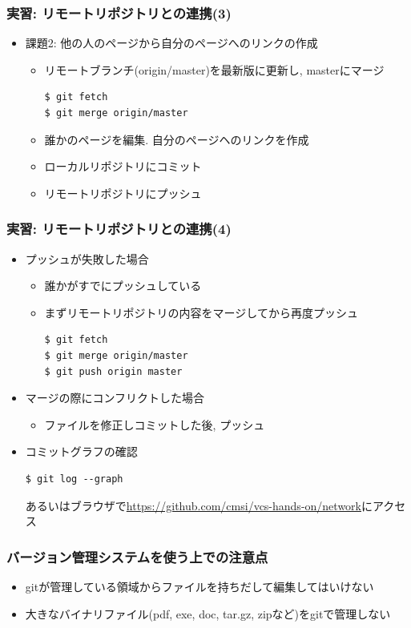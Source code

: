 \begin{frame}[t,fragile]
  \frametitle{実習: リモートリポジトリとの連携(3)}
  \begin{itemize}
  \item 課題2: 他の人のページから自分のページへのリンクの作成
    \begin{itemize}
      \item リモートブランチ(origin/master)を最新版に更新し, masterにマージ
\begin{lstlisting}
$ git fetch
$ git merge origin/master
\end{lstlisting}
      \item 誰かのページを編集. 自分のページヘのリンクを作成
      \item ローカルリポジトリにコミット
      \item リモートリポジトリにプッシュ
    \end{itemize}
  \end{itemize}
\end{frame}

\begin{frame}[t,fragile]
  \frametitle{実習: リモートリポジトリとの連携(4)}
  \begin{itemize}
  \item プッシュが失敗した場合
    \begin{itemize}
      \item 誰かがすでにプッシュしている
      \item まずリモートリポジトリの内容をマージしてから再度プッシュ
\begin{lstlisting}
$ git fetch
$ git merge origin/master
$ git push origin master
\end{lstlisting}
    \end{itemize}
  \item マージの際にコンフリクトした場合
    \begin{itemize}
      \item ファイルを修正しコミットした後, プッシュ
    \end{itemize}
  \item コミットグラフの確認
\begin{lstlisting}
$ git log --graph
\end{lstlisting}
    あるいはブラウザで\url{https://github.com/cmsi/vcs-hands-on/network}にアクセス
  \end{itemize}
\end{frame}

\begin{frame}
  \frametitle{バージョン管理システムを使う上での注意点}
  \begin{itemize}
    \setlength{\itemsep}{1em}
  \item gitが管理している領域からファイルを持ちだして編集してはいけない
  \item 大きなバイナリファイル(pdf, exe, doc, tar.gz, zipなど)をgitで管理しない
  \end{itemize}
\end{frame}

